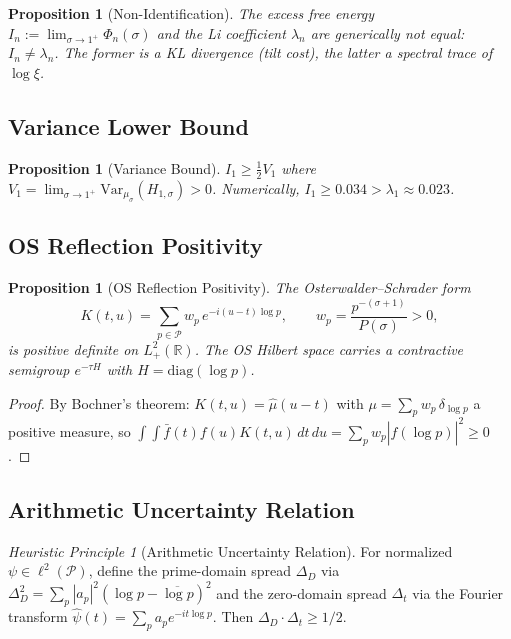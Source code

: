 \documentclass[12pt,a4paper]{article}
\newtheorem{proposition}[theorem]{Proposition}
\theoremstyle{definition}
\theoremstyle{remark}
\newtheorem{heuristic}[theorem]{Heuristic Principle}
\newcommand{\muG}{\mu_\sigma}
\newcommand{\PP}{\mathcal{P}}
\begin{document}
\begin{proposition}[Non-Identification]
\label{prop:non-ident}
The excess free energy $I_n := \lim_{\sigma \to 1^+}\Phi_n(\sigma)$ and the Li coefficient $\lambda_n$ are generically \emph{not} equal: $I_n \neq \lambda_n$. The former is a KL divergence (tilt cost), the latter a spectral trace of $\log\xi$.
\end{proposition}

\subsection{Variance Lower Bound}

\begin{proposition}[Variance Bound]
\label{prop:variance}
$I_1 \geq \frac{1}{2}V_1$ where $V_1 = \lim_{\sigma \to 1^+}\mathrm{Var}_{\muG}(H_{1,\sigma}) > 0$. Numerically, $I_1 \geq 0.034 > \lambda_1 \approx 0.023$.
\end{proposition}

\subsection{OS Reflection Positivity}

\begin{proposition}[OS Reflection Positivity]
\label{prop:os}
The Osterwalder--Schrader form
\[
K(t,u) = \sum_{p \in \PP} w_p\,e^{-i(u-t)\log p}, \qquad w_p = \frac{p^{-(\sigma+1)}}{P(\sigma)} > 0,
\]
is positive definite on $L^2_+(\mathbb{R})$. The OS Hilbert space carries a contractive semigroup $e^{-\tau H}$ with $H = \mathrm{diag}(\log p)$.
\end{proposition}

\begin{proof}
By Bochner's theorem: $K(t,u) = \hat{\mu}(u-t)$ with $\mu = \sum_p w_p\,\delta_{\log p}$ a positive measure, so $\int\!\!\int \bar{f}(t)f(u)K(t,u)\,dt\,du = \sum_p w_p|\hat{f}(\log p)|^2 \geq 0$.
\end{proof}

\subsection{Arithmetic Uncertainty Relation}

\begin{heuristic}[Arithmetic Uncertainty Relation]
\label{heur:uncertainty}
For normalized $\psi \in \ell^2(\PP)$, define the prime-domain spread $\Delta_D$ via $\Delta_D^2 = \sum_p |a_p|^2(\log p - \overline{\log p})^2$ and the zero-domain spread $\Delta_t$ via the Fourier transform $\hat\psi(t) = \sum_p a_p e^{-it\log p}$. Then $\Delta_D \cdot \Delta_t \geq 1/2$.
\end{heuristic}
\end{document}
